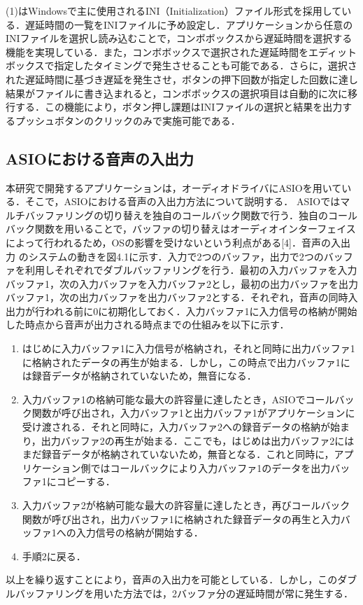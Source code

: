 (1)はWindowsで主に使用されるINI（Initialization）ファイル形式を採用している．遅延時間の一覧をINIファイルに予め設定し．アプリケーションから任意のINIファイルを選択し読み込むことで，コンボボックスから遅延時間を選択する機能を実現している．また，コンボボックスで選択された遅延時間をエディットボックスで指定したタイミングで発生させることも可能である．さらに，選択された遅延時間に基づき遅延を発生させ，ボタンの押下回数が指定した回数に達し結果がファイルに書き込まれると，コンボボックスの選択項目は自動的に次に移行する．この機能により，ボタン押し課題はINIファイルの選択と結果を出力するプッシュボタンのクリックのみで実施可能である．
\subsection{ASIOにおける音声の入出力}
本研究で開発するアプリケーションは，オーディオドライバにASIOを用いている．そこで，ASIOにおける音声の入出力方法について説明する．
ASIOではマルチバッファリングの切り替えを独自のコールバック関数で行う．独自のコールバック関数を用いることで，バッファの切り替えはオーディオインターフェイスによって行われるため，OSの影響を受けないという利点がある[4]．音声の入出力
のシステムの動きを図4.1に示す．入力で2つのバッファ，出力で2つのバッファを利用しそれぞれでダブルバッファリングを行う．最初の入力バッファを入力バッファ1，次の入力バッファを入力バッファ2とし，最初の出力バッファを出力バッファ1，次の出力バッファを出力バッファ2とする．それぞれ，音声の同時入出力が行われる前に0に初期化しておく．入力バッファ1に入力信号の格納が開始した時点から音声が出力される時点までの仕組みを以下に示す．
\begin{enumerate}[leftmargin=*]
\item はじめに入力バッファ1に入力信号が格納され，それと同時に出力バッファ1に格納されたデータの再生が始まる．しかし，この時点で出力バッファ1には録音データが格納されていないため，無音になる．
\item 入力バッファ1の格納可能な最大の許容量に達したとき，ASIOでコールバック関数が呼び出され，入力バッファ1と出力バッファ1がアプリケーションに受け渡される．それと同時に，入力バッファ2への録音データの格納が始まり，出力バッファ2の再生が始まる．ここでも，はじめは出力バッファ2にはまだ録音データが格納されていないため，無音となる．これと同時に，アプリケーション側ではコールバックにより入力バッファ1のデータを出力バッファ1にコピーする．
\item 入力バッファ2が格納可能な最大の許容量に達したとき，再びコールバック関数が呼び出され，出力バッファ1に格納された録音データの再生と入力バッファ1への入力信号の格納が開始する．
\item 手順2に戻る．
\end{enumerate}
以上を繰り返すことにより，音声の入出力を可能としている．しかし，このダブルバッファリングを用いた方法では，2バッファ分の遅延時間が常に発生する．
